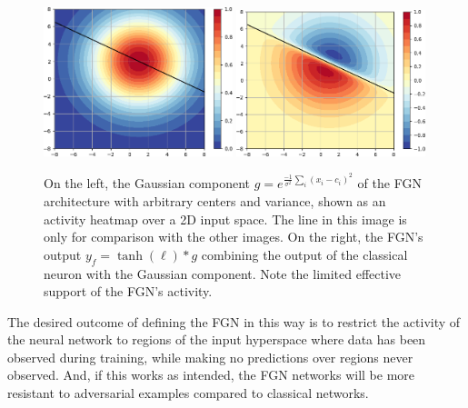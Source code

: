 \documentclass[12pt,oneside]{CUNY_PhD}
\begin{document}
\begin{figure}[!t]
    \centering
    \includegraphics[width=0.49\textwidth]{images/2D Activity/2d-gaussian-activity-cropped.png}
    \includegraphics[width=0.49\textwidth]{images/2D Activity/2d-fgn-activity-cropped.png}
    \caption{On the left, the Gaussian component $g = e^{\frac{-1}{\sigma^2}\sum_{i}(x_i-c_i)^2}$ of the FGN architecture with arbitrary centers and variance, shown as an activity heatmap over a 2D input space. The line in this image is only for comparison with the other images. On the right, the FGN's output $y_f = \tanh(\ell) * g$ combining the output of the classical neuron with the Gaussian component. Note the limited effective support of the FGN's activity.}
    \label{fig:fgn-heatmap}
\end{figure}

The desired outcome of defining the FGN in this way is to restrict the activity of the neural network to regions of the input hyperspace where data has been observed during training, while making no predictions over regions never observed. And, if this works as intended, the FGN networks will be more resistant to adversarial examples compared to classical networks.
\end{document}
